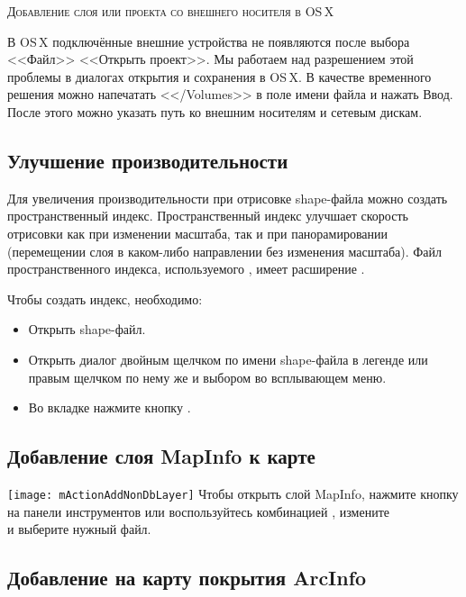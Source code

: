 \begin{Tip}\caption{\textsc{Добавление слоя или проекта со внешнего носителя в OS\,X}}
В OS\,X подключённые внешние устройства не появляются после выбора <<Файл>> \arrow
<<Открыть проект>>. Мы работаем над разрешением этой проблемы в диалогах
открытия и сохранения в OS\,X. В качестве временного решения можно напечатать
<</Volumes>> в поле имени файла и нажать Ввод. После этого можно указать путь
ко внешним носителям и сетевым дискам.
\end{Tip}

\subsection{Улучшение производительности}

Для увеличения производительности при отрисовке shape-файла можно создать
пространственный индекс. Пространственный индекс 
улучшает скорость отрисовки как при изменении масштаба, так и при
панорамировании (перемещении слоя в каком-либо направлении без изменения
масштаба). Файл пространственного индекса, используемого \qg, имеет
расширение .

Чтобы создать индекс, необходимо:

\begin{itemize}[label=--]
\item Открыть shape-файл.
\item Открыть диалог  двойным щелчком по имени
shape-файла в легенде или правым щелчком по нему же и выбором
 во всплывающем меню.
\item Во вкладке  нажмите кнопку .
\end{itemize}

\subsection{Добавление слоя MapInfo к карте}

\texttt{[image: mActionAddNonDbLayer]} Чтобы открыть слой
MapInfo, нажмите кнопку  на панели инструментов или воспользуйтесь комбинацией
, измените \\
и выберите нужный файл.

\subsection{Добавление на карту покрытия ArcInfo}

